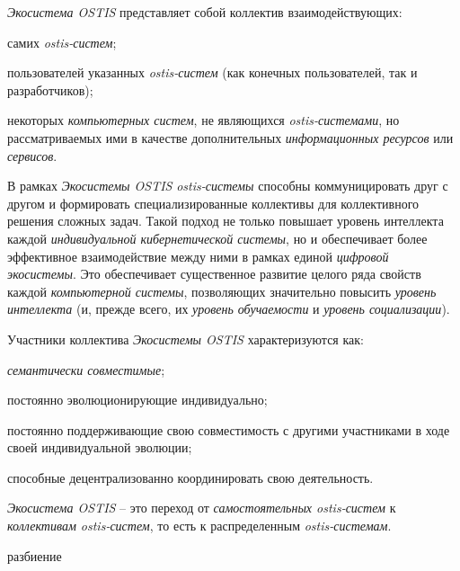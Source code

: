 \textit{Экосистема OSTIS} представляет собой коллектив взаимодействующих:
\begin{textitemize}
    \item самих \textit{ostis-систем};
    \item пользователей указанных \textit{ostis-систем} (как конечных пользователей, так и разработчиков);
    \item некоторых \textit{компьютерных систем}, не являющихся \textit{ostis-системами}, но рассматриваемых ими в качестве дополнительных \textit{информационных ресурсов} или \textit{сервисов}.
\end{textitemize}

В рамках \textit{Экосистемы OSTIS} \textit{ostis-системы} способны коммуницировать друг с другом и формировать специализированные коллективы для коллективного решения сложных задач. Такой подход не только повышает уровень интеллекта каждой \textit{индивидуальной кибернетической системы}, но и обеспечивает более эффективное взаимодействие между ними в рамках единой \textit{цифровой экосистемы}. Это обеспечивает существенное развитие целого ряда свойств каждой \textit{компьютерной системы}, позволяющих значительно повысить \textit{уровень интеллекта} (и, прежде всего, их \textit{уровень обучаемости} и \textit{уровень социализации}). 

Участники коллектива \textit{Экосистемы OSTIS} характеризуются как:
\begin{textitemize}
    \item \textit{семантически совместимые};
    \item постоянно эволюционирующие индивидуально;
    \item постоянно поддерживающие свою совместимость с другими участниками в ходе своей индивидуальной эволюции;
    \item способные децентрализованно координировать свою деятельность.
\end{textitemize}

\textit{Экосистема OSTIS} – это переход от \textit{самостоятельных ostis-систем} к \textit{коллективам ostis-систем}, то есть к распределенным \textit{ostis-системам}.

\begin{SCn}
\begin{scnrelfromset}{разбиение}
\end{scnrelfromset}
\end{SCn}

